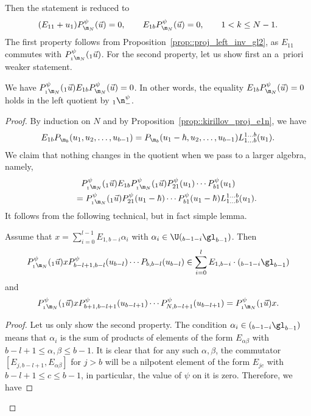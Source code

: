 	Then the statement is reduced to
	\begin{align*}
			(E_{11} + u_1) P_{\m_N}^{\psi}(\vec{u}) = 0, \qquad
			E_{1b} P_{\m_N}^{\psi}(\vec{u}) = 0,\qquad 1< k \leq N-1.
	\end{align*}
	The first property follows from Proposition~\ref{prop::proj_left_inv_gl2}, as $E_{11}$ commutes with $P_{{}_1\m_{N}}^{\psi}({}_1\vec{u})$. For the second property, let us show first an a~priori weaker statement.
	\begin{Proposition}
		\label{prop::left_inv_proj_quotient}
		We have
$
		P_{{}_1\m_{N}}^{\psi}({}_1\vec{u}) E_{1b} P_{ \m_{N}}^{\psi}(\vec{u}) = 0$.
		In other words, the equality $E_{1b} P_{ \m_{N}}^{\psi}(\vec{u})\allowbreak=0$ holds in the left quotient by ${}_1\n_-^{\psi}$.
		\begin{proof}
			By induction on $N$ and by Proposition~\ref{prop::kirillov_proj_e1n}, we have
			\[
			E_{1b}P_{\m_b}(u_1,u_2,\dots,u_{b-1}) = P_{\m_b}(u_1-\hbar,u_2,\dots,u_{b-1}) L_{1\dots b}^{1\dots b} (u_1).
			\]
			We claim that nothing changes in the quotient when we pass to a larger algebra, namely,
			\begin{gather*}
				P_{{}_1\m_N}^{\psi}({}_1\vec{u}) E_{1b} P_{{}_1\m_N}^{\psi}({}_1\vec{u}) P_{21}^{\psi}(u_1) \cdots P_{b1}^{\psi}(u_1) \\
				\qquad=P_{{}_1\m_N}^{\psi}({}_1\vec{u}) P_{21}^{\psi}(u_1-\hbar) \cdots P_{b1}^{\psi}(u_1-\hbar) L_{1\dots b}^{1\dots b}(u_1).
			\end{gather*}
			It follows from the following technical, but in fact simple lemma.
			\begin{Lemma}
				Assume that $x = \sum_{i=0}^{l-1} E_{1,b-i} \alpha_i$ with $\alpha_i \in \U({}_{b-1-i} \gl_{b-1})$. Then
				\[
				P_{{}_1\m_{N}}^{\psi}({}_1\vec{u}) x P_{b-l+1,b-l}^{\psi} (u_{b-l}) \cdots P_{b,b-l}(u_{b-l}) \in \sum_{i=0}^{l} E_{1,b-i} \cdot ({}_{b-1-i} \gl_{b-1})
				\]
				and
				\[
				P_{{}_1\m_{N}}^{\psi}({}_1\vec{u}) x P_{b+1,b-l+1}^{\psi}(u_{b-l+1}) \cdots P_{N,b-l+1}^{\psi}(u_{b-l+1}) = P_{{}_1\m_{N}}^{\psi}({}_1\vec{u}) x.
				\]
				\begin{proof}
					Let us only show the second property. The condition $\alpha_i \in ({}_{b-1-i} \gl_{b-1})$ means that $\alpha_i$ is the sum of products of elements of the form $E_{\alpha\beta}$ with $b-l+1 \leq \alpha,\beta \leq b-1$. It is clear that for any such $\alpha,\beta$, the commutator $[E_{j,b-l+1},E_{\alpha \beta}]$ for $j>b$ will be a nilpotent element of the form $E_{jc}$ with $b-l+1 \leq c \leq b-1$, in particular, the value of $\psi$ on it is zero. Therefore, we have

\end{proof}
\end{Lemma}
\end{proof}
\end{Proposition}
